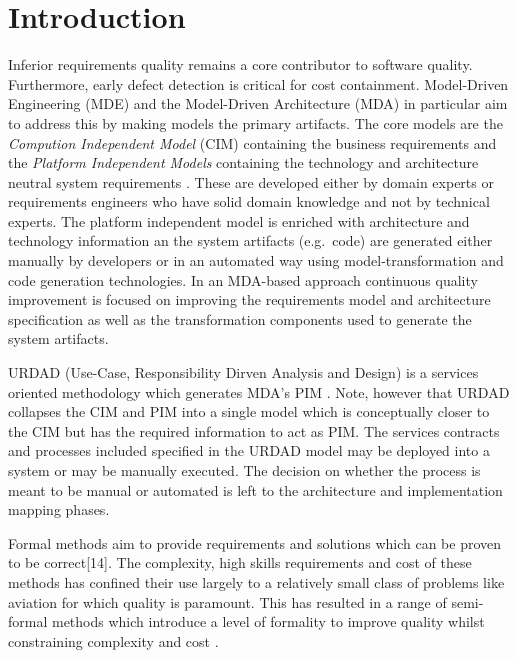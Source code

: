 \section{Introduction}\label{sec:Introduction}

Inferior requirements quality remains a core contributor to software quality\cite{heck_experiences_2008,_strategies_2011}. Furthermore, early defect detection is critical for cost containment\cite{betterRefernceThanBoehm1981WhichReliesOnWaterfall}. Model-Driven Engineering (MDE) and the Model-Driven Architecture (MDA) \cite{frankel_model_2003} in particular aim to address this by making models the primary artifacts. The core models are the \emph{Compution Independent Model} (CIM) containing the business requirements and the \emph{Platform Independent Models} containing the technology and architecture neutral system requirements \cite{needAGoodCitation}. These are developed either by domain experts or requirements engineers who have solid domain knowledge and not by technical experts. The platform independent model is enriched with architecture and technology information an the system artifacts (e.g.\ code) are generated either manually by developers or in an automated way using model-transformation and code generation technologies. In an MDA-based approach continuous quality improvement is focused on improving the requirements model and architecture specification as well as the transformation components used to generate the system artifacts.

URDAD (Use-Case, Responsibility Dirven Analysis and Design) \cite{solms_technology_2007} is a services oriented methodology which generates MDA's PIM \cite{solms_generating_2009}. Note, however that URDAD collapses the CIM and PIM into a single model which is conceptually closer to the CIM but has the required information to act as PIM. The services contracts and processes included specified in the URDAD model may be deployed into a system or may be manually executed. The decision on whether the process is meant to be manual or automated is left to the architecture and implementation mapping phases. 

Formal methods aim to provide requirements and solutions which can be proven to be correct[14]. The complexity, high skills requirements and cost of these methods \cite{} has confined their use largely to a relatively small class of problems like aviation \cite{Hall} for which quality is paramount. This has resulted in a range of semi-formal methods which introduce a level of formality to improve quality whilst constraining complexity and cost \cite{}.

